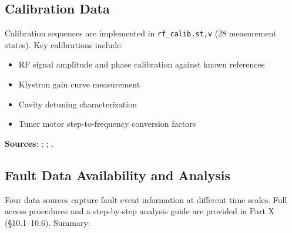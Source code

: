 \subsection{Calibration Data}

Calibration sequences are implemented in \texttt{rf\_calib.st,v} (28 measurement states). Key calibrations include:

\begin{itemize}
\tightlist
\item
  RF signal amplitude and phase calibration against known references
\item
  Klystron gain curve measurement
\item
  Cavity detuning characterization
\item
  Tuner motor step-to-frequency conversion factors
\end{itemize}

\begin{keynote}
\textbf{Sources}: ; ; .
\end{keynote}

\subsection{Fault Data Availability and Analysis}

Four data sources capture fault event information at different time scales. Full access procedures and a step-by-step analysis guide are provided in  Part X (§10.1--10.6). Summary:

